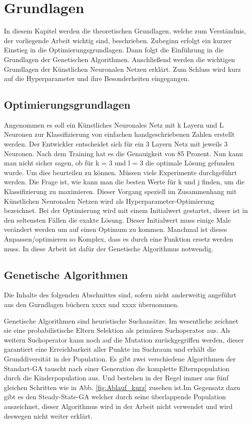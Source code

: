 \section{Grundlagen}
\label{sec:Grundlagen}
In diesem Kapitel werden die theoretischen Grundlagen, welche zum Verständnis, der vorliegende Arbeit wichtig sind, beschrieben. Zubeginn erfolgt ein kurzer Einstieg in die Optimierungsgrundlagen. Dann folgt die Einführung in die Grundlagen der Genetischen Algorithmen. Anschließend werden die wichtigen Grundlagen der Künstlichen Neuronalen Netzen erklärt. Zum Schluss wird kurz auf die Hyperparameter und ihre Besonderheiten eingegangen.

\subsection{Optimierungsgrundlagen}
Angenommen es soll ein Künstliches Neuronales Netz mit k Layern und L Neuronen zur Klassifizierung von einfachen handgeschriebenen Zahlen erstellt werden. Der Entwickler entscheidet sich für ein 3 Layern Netz mit jeweils 3 Neuronen. Nach dem Training hat es die Genauigkeit von 85 Prozent. Nun kann man nicht sicher sagen, ob für k = 3 und l = 3  die optimale Lösung gefunden wurde. Um dies beurteilen zu können. Müssen viele Experimente durchgeführt werden. Die Frage ist, wie kann man die besten Werte für k und j finden, um die Klassifizierung zu maximieren. Dieser Vorgang speziell im Zusammenhang mit Künstlichen Neuronalen Netzen wird als Hyperparameter-Optimierung bezeichnet. Bei der Optimierung wird mit einem Initialwert gestartet, dieser ist in den seltensten Fällen die exakte Lösung. Dieser Initialwert muss einige Male verändert werden um auf einen Optimum zu kommen. Manchmal ist dieses Anpassen/optimieren so Komplex, dass es durch eine Funktion ersetz werden muss. In diese Arbeit ist dafür der Genetische Algorithmus notwendig.


\subsection{Genetische Algorithmen}

Die Inhalte des folgenden Abschnittes sind, sofern nicht anderweitig angeführt aus den Gurndlagen büchern xxxx und xxxx übernommen. 




Genetische Algorithmen sind heuristische Suchansätze. Im wesentliche zeichnet sie eine probabilistische Eltern Selektion als primären Suchoperator aus. Als weitern Suchoperator kann noch auf die Mutation zurückgegriffen werden, dieser garantiert eine Erreichbarkeit aller Punkte im Suchraum und erhält die Grunddiversität in der Population. Es gibt zwei verschiedene Algorithmen der Standart-GA tauscht nach einer Generation die komplette Elternpopulation durch die Kinderpopulation aus. Und bestehen in der Regel immer aus fünf gleichen Schritten wie in Abb. \ref{fig:Ablauf_kurz} zusehen ist.Im Gegensatz dazu gibt es den Steady-State-GA welcher durch seine überlappende Population auszeichnet, dieser Algorithmus wird in der Arbeit nicht verwendet und wird deswegen nicht weiter erklärt. 


